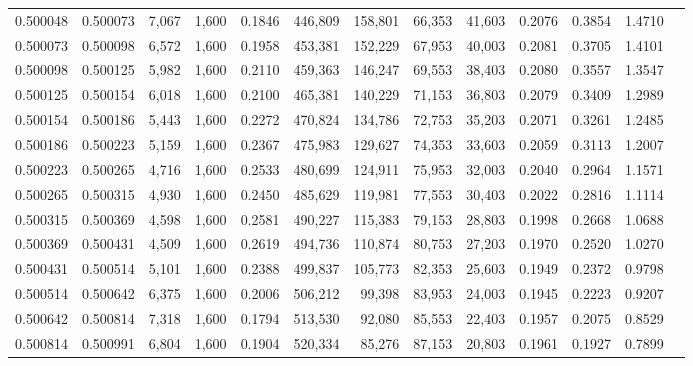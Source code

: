 \begin{tabular}{rrrrrrrrrrrrr}
0.500048 & 0.500073 &  7,067 & 1,600 &                                     0.1846 & 446,809 & 158,801 &  66,353 &  41,603 & 0.2076 & 0.3854 & 1.4710 \\
0.500073 & 0.500098 &  6,572 & 1,600 &                                     0.1958 & 453,381 & 152,229 &  67,953 &  40,003 & 0.2081 & 0.3705 & 1.4101 \\
0.500098 & 0.500125 &  5,982 & 1,600 &                                     0.2110 & 459,363 & 146,247 &  69,553 &  38,403 & 0.2080 & 0.3557 & 1.3547 \\
0.500125 & 0.500154 &  6,018 & 1,600 &                                     0.2100 & 465,381 & 140,229 &  71,153 &  36,803 & 0.2079 & 0.3409 & 1.2989 \\
0.500154 & 0.500186 &  5,443 & 1,600 &                                     0.2272 & 470,824 & 134,786 &  72,753 &  35,203 & 0.2071 & 0.3261 & 1.2485 \\
0.500186 & 0.500223 &  5,159 & 1,600 &                                     0.2367 & 475,983 & 129,627 &  74,353 &  33,603 & 0.2059 & 0.3113 & 1.2007 \\
0.500223 & 0.500265 &  4,716 & 1,600 &                                     0.2533 & 480,699 & 124,911 &  75,953 &  32,003 & 0.2040 & 0.2964 & 1.1571 \\
0.500265 & 0.500315 &  4,930 & 1,600 &                                     0.2450 & 485,629 & 119,981 &  77,553 &  30,403 & 0.2022 & 0.2816 & 1.1114 \\
0.500315 & 0.500369 &  4,598 & 1,600 &                                     0.2581 & 490,227 & 115,383 &  79,153 &  28,803 & 0.1998 & 0.2668 & 1.0688 \\
0.500369 & 0.500431 &  4,509 & 1,600 &                                     0.2619 & 494,736 & 110,874 &  80,753 &  27,203 & 0.1970 & 0.2520 & 1.0270 \\
0.500431 & 0.500514 &  5,101 & 1,600 &                                     0.2388 & 499,837 & 105,773 &  82,353 &  25,603 & 0.1949 & 0.2372 & 0.9798 \\
0.500514 & 0.500642 &  6,375 & 1,600 &                                     0.2006 & 506,212 &  99,398 &  83,953 &  24,003 & 0.1945 & 0.2223 & 0.9207 \\
0.500642 & 0.500814 &  7,318 & 1,600 &                                     0.1794 & 513,530 &  92,080 &  85,553 &  22,403 & 0.1957 & 0.2075 & 0.8529 \\
0.500814 & 0.500991 &  6,804 & 1,600 &                                     0.1904 & 520,334 &  85,276 &  87,153 &  20,803 & 0.1961 & 0.1927 & 0.7899 \\

\end{tabular}
